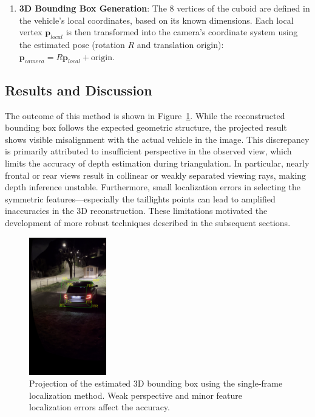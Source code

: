 \begin{enumerate}
    \item \textbf{3D Bounding Box Generation}: The 8 vertices of the cuboid are defined in the vehicle's local coordinates, based on its known dimensions. Each local vertex $\mathbf{p}_{local}$ is then transformed into the camera's coordinate system using the estimated pose (rotation $R$ and translation origin): $\mathbf{p}_{camera} = R \mathbf{p}_{local} + \text{origin}$.
\end{enumerate}

\subsection{Results and Discussion}
The outcome of this method is shown in Figure~\ref{fig:method1_result}. While the reconstructed bounding box follows the expected geometric structure, the projected result shows visible misalignment with the actual vehicle in the image. This discrepancy is primarily attributed to insufficient perspective in the observed view, which limits the accuracy of depth estimation during triangulation. In particular, nearly frontal or rear views result in collinear or weakly separated viewing rays, making depth inference unstable. Furthermore, small localization errors in selecting the symmetric features—especially the taillights points can lead to amplified inaccuracies in the 3D reconstruction. These limitations motivated the development of more robust techniques described in the subsequent sections.

\begin{figure}[htbp]
    \centering
    \includegraphics[width=0.30\textwidth]{Images/method1/bbox1.jpg}
    \caption{Projection of the estimated 3D bounding box using the single-frame localization method. Weak perspective and minor feature localization errors affect the accuracy.}
    \label{fig:method1_result}
\end{figure}

